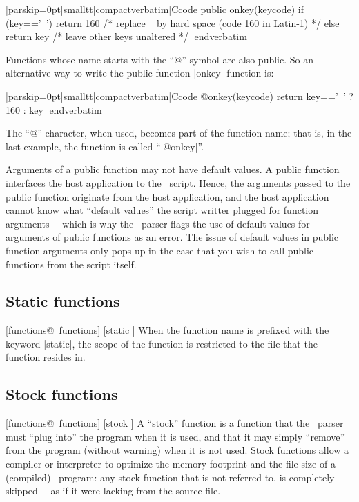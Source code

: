 \goodbreak
\listingx\verbatim|parskip=0pt|smalltt|compactverbatim|Ccode
public onkey(keycode)
    {
    if (key=='~')
        return 160      /* replace ~ by hard space (code 160 in Latin-1) */
    else
        return key      /* leave other keys unaltered */
    }
|endverbatim\endlistingx

Functions whose name starts with the ``@'' symbol are also public. So an
alternative way to write the public function |onkey| function is:

\listingx\verbatim|parskip=0pt|smalltt|compactverbatim|Ccode
@onkey(keycode)
    return key=='~' ? 160 : key
|endverbatim\endlistingx

The ``@'' character, when used, becomes part of the function name; that is,
in the last example, the function is called ``|@onkey|''.

\noindent{}%
Arguments of a public function may not have default values. A public function
interfaces the host application to the \Small\ script. Hence, the arguments
passed to the public function originate from the host application, and the
host application cannot know what ``default values'' the script writter plugged
for function arguments ---which is why the \Small\ parser flags the use of
default values for arguments of public functions as an error. The issue of
default values in public function arguments only pops up in the case that you
wish to call public functions from the script itself.


\subsection{Static functions}
[functions@\midtilde\ functions] [static \midtilde]
When the function name is prefixed with the keyword |static|, the scope of the
function is restricted to the file that the function resides in.


\subsection{Stock functions}
 [functions@\midtilde\ functions] [stock \midtilde]
A ``stock'' function is a function that the \Small\ parser must ``plug into''
the program when it is used, and that it may simply ``remove'' from the
program (without warning) when it is not used. Stock functions allow a
compiler or interpreter to optimize the memory footprint and the file size of
a (compiled) \Small\ program: any stock function that is not referred to, is
completely skipped ---as if it were lacking from the source file.

